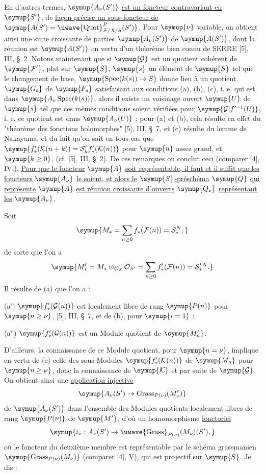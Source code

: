 En d'autres termes, $\symup{A_\nu(S')}$ \uline{est un foncteur contravariant en} $\symup{S'}$, de \uline{façon
précise un sous-foncteur de}
$\symup{A(S')=\mathop{\text{\uwave{Quot}}}\nolimits^P_{\mathcal F/X/S}(S')}$. Pour $\symup{\nu}$
variable, on obtient ainsi une suite croissante de parties $\symup{A_\nu(S')}$ de
$\symup{A(S')}$, dont la réunion est $\symup{A(S')}$ en vertu d'un théorème bien connu de
SERRE [5], III, \S~2. Notons maintenant que si $\symup{\mathcal G}$ est un quotient
cohérent de $\symup{\mathcal F'}$, plat sur $\symup{S}$, $\symup{s}$ un élément de $\symup{S}$ tel que le
changement de base, $\symup{\operatorname{Spec}(k(s))\to S}$ donne lieu à
un quotient $\symup{G_s}$ de $\symup{F_s}$ satisfaisant aux conditions (a),
(b), (c), i. e. qui est dans $\symup{A_\nu\operatorname{Spec}(k(s))}$, alors il existe
un voisinage ouvert $\symup{U}$ de $\symup{s}$ tel que ces mêmes conditions soient vérifiées
pour $\symup{\mathcal G|f'^{-1}(U)}$, i. e. ce quotient est dans $\symup{A_\nu(U)}$ ; pour (a)
et (b), cela résulte en effet du "théorème des fonctions holomorphes" [5],
III, \S~7, et (c) résulte du lemme de Nakayama, et du fait qu'on sait en tous
cas que
$\symup{f'_*(\mathcal K(n+k))=\mathcal S'_k f'_*(\mathcal K(n))}$
pour $\symup{n}$ assez grand, et $\symup{k\geq0}$, (cf. [5], III, \S~2). De ces remarques on
conclut ceci (comparer [4], IV,). \uline{Pour que le foncteur} $\symup{A}$ \uline{soit représentable,
il faut et il suffit que les foncteurs} $\symup{A_\nu}$ \uline{le soient, et alors le}
$\symup{S}$\uline{-préschéma} $\symup{Q}$ \uline{qui représente} $\symup{A}$ \uline{est réunion croissante d'ouverts} $\symup{Q_\nu}$
\uline{représentant les} $\symup{A_\nu}$.

Soit
\[
\symup{M_* =\sum_{n\geq0}f_*(\mathcal F(n))=\mathcal S_*^{N},}
\]
de sorte que l'on a
\[
\symup{M'_* =M_*\otimes_{\mathcal O_S}\mathcal O_{S'}
=\sum_{n\geq0}f'_*(\mathcal F(n))=\mathcal S'_*{}^{N}.}
\]
Il résulte de (a) que l'on a :

\noindent (a') $\symup{f'_*(\mathcal G(n))}$ est localement libre de rang $\symup{P(n)}$ pour
$\symup{n\geq\nu}$, [5], III, \S~7, et de (b), pour $\symup{i=1}$ :

\noindent (a'') $\symup{f'_*(\mathcal G(n))}$ est un Module quotient de $\symup{M'_n}$.

D'ailleurs, la connaissance de ce Module quotient, pour $\symup{n=\nu}$, implique en
vertu de (c) celle des sous-Modules $\symup{f'_*(\mathcal K(n))}$ de $\symup{M_n}$ pour
$\symup{n\geq\nu}$, donc la connaissance de $\symup{\mathcal K}$ et par suite de $\symup{\mathcal G}$.
On obtient ainsi une \uline{application injective}
\[
\symup{A_\nu(S')\to\operatorname{Grass}_{P(\nu)}(M'_\nu)}
\]
de $\symup{A_\nu(S')}$ dans l'ensemble des Modules quotients localement libres de rang
$\symup{P(\nu)}$ de $\symup{M'}$, d'où un homomorphisme \uline{fonctoriel}
\[
\symup{i_\nu:A_\nu(S')\to
\mathop{\text{\uwave{Grass}}}\nolimits_{P(\nu)}(M_\nu)(S'),}
\]
où le foncteur du deuxième membre est représentable par le schéma grassmanien
$\symup{\operatorname{Grass}_{P(\nu)}(M_\nu)}$ (comparer [4], V), qui est projectif
sur $\symup{S}$. Je dis :

